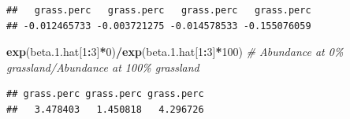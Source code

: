 \documentclass[
]{book}
\newenvironment{Shaded}{\begin{snugshade}}{\end{snugshade}}
\newcommand{\CommentTok}[1]{\textcolor[rgb]{0.56,0.35,0.01}{\textit{#1}}}
\newcommand{\DecValTok}[1]{\textcolor[rgb]{0.00,0.00,0.81}{#1}}
\newcommand{\FloatTok}[1]{\textcolor[rgb]{0.00,0.00,0.81}{#1}}
\newcommand{\FunctionTok}[1]{\textcolor[rgb]{0.13,0.29,0.53}{\textbf{#1}}}
\newcommand{\NormalTok}[1]{#1}
\newcommand{\SpecialCharTok}[1]{\textcolor[rgb]{0.81,0.36,0.00}{\textbf{#1}}}
\begin{document}
\begin{verbatim}
##   grass.perc   grass.perc   grass.perc   grass.perc 
## -0.012465733 -0.003721275 -0.014578533 -0.155076059
\end{verbatim}

\begin{Shaded}
\begin{Highlighting}[]
\FunctionTok{exp}\NormalTok{(beta.}\FloatTok{1.}\NormalTok{hat[}\DecValTok{1}\SpecialCharTok{:}\DecValTok{3}\NormalTok{]}\SpecialCharTok{*}\DecValTok{0}\NormalTok{)}\SpecialCharTok{/}\FunctionTok{exp}\NormalTok{(beta.}\FloatTok{1.}\NormalTok{hat[}\DecValTok{1}\SpecialCharTok{:}\DecValTok{3}\NormalTok{]}\SpecialCharTok{*}\DecValTok{100}\NormalTok{) }\CommentTok{\# Abundance at 0\% grassland/Abundance at 100\% grassland}
\end{Highlighting}
\end{Shaded}

\begin{verbatim}
## grass.perc grass.perc grass.perc 
##   3.478403   1.450818   4.296726
\end{verbatim}
\end{document}
